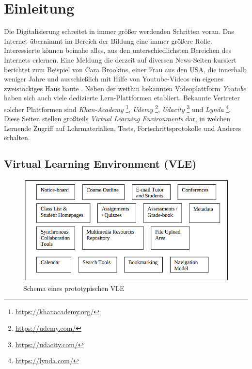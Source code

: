\documentclass[11pt,a4paper,twoside,ngerman]{article}
\begin{document}
\clearpage

\setcounter{page}{1}
\fancyhead[LE,RO]{\rightmark}
\fancyhead[LO,RE]{\leftmark}
\fancyfoot[LE,RO]{\thepage}

\section{Einleitung} \label{sec:introduction}
Die Digitalisierung schreitet in immer größer werdenden Schritten voran. Das Internet übernimmt im Bereich der Bildung eine immer größere Rolle. Interessierte können beinahe alles, aus den unterschiedlichsten Bereichen des Internets erlernen. Eine Meldung die derzeit auf diversen News-Seiten kursiert berichtet zum Beispiel von Cara Brookins, einer Frau aus den USA, die innerhalb weniger Jahre und ausschießlich mit Hilfe von Youtube-Videos ein eigenes zweistöckiges Haus baute \cite{web:nyyoutubehouse}. Neben der weithin bekannten Videoplattform \textit{Youtube} haben sich auch viele dedizierte Lern-Plattformen etabliert. Bekannte Vertreter solcher Plattformen sind \textit{Khan-Academy} \footnote{\url{https://khanacademy.org/}}, \textit{Udemy} \footnote{\url{https://udemy.com/}}, \textit{Udacity} \footnote{\url{https://udacity.com/}} und \textit{Lynda} \footnote{\url{https://lynda.com/}}. Diese Seiten stellen großteils \textit{Virtual Learning Environments} dar, in welchen Lernende Zugriff auf Lehrmaterialien, Tests, Fortschrittsprotokolle und Anderes erhalten.

\subsection{Virtual Learning Environment (VLE)} \label{sec:intro-vle}

\begin{figure}[h]
    \centering
    \includegraphics[width=13cm]{images/protovle.png}
    \caption{Schema eines prototypischen VLE \cite{jtap-vle}}
    \label{fig:prototypical_vle}
\end{figure}
\end{document}

